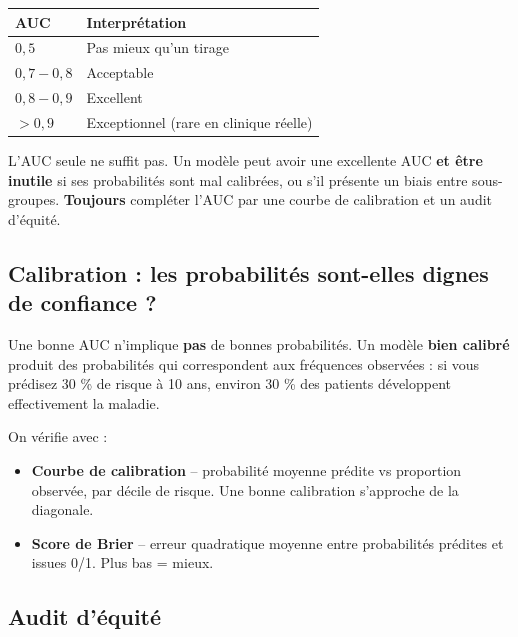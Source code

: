 \documentclass[11pt,a4paper]{article}
\begin{document}
\begin{table}[h]
\centering
\begin{tabular}{ll}
\toprule
AUC & Interpr\'etation \\
\midrule
$0{,}5$              & Pas mieux qu'un tirage \\
$0{,}7 - 0{,}8$      & Acceptable \\
$0{,}8 - 0{,}9$      & Excellent \\
$> 0{,}9$            & Exceptionnel (rare en clinique r\'eelle) \\
\bottomrule
\end{tabular}
\end{table}

\begin{attention}
L'AUC seule ne suffit pas. Un mod\`ele peut avoir une excellente AUC
\textbf{et \^etre inutile} si ses probabilit\'es sont mal calibr\'ees,
ou s'il pr\'esente un biais entre sous-groupes. \textbf{Toujours}
compl\'eter l'AUC par une courbe de calibration et un audit d'\'equit\'e.
\end{attention}

\subsection{Calibration : les probabilit\'es sont-elles dignes de confiance ?}

Une bonne AUC n'implique \textbf{pas} de bonnes probabilit\'es. Un
mod\`ele \textbf{bien calibr\'e} produit des probabilit\'es qui
correspondent aux fr\'equences observ\'ees : si vous pr\'edisez 30 \% de
risque \`a 10 ans, environ 30 \% des patients d\'eveloppent
effectivement la maladie.

On v\'erifie avec :

\begin{itemize}
  \item \textbf{Courbe de calibration} -- probabilit\'e moyenne pr\'edite
        vs proportion observ\'ee, par d\'ecile de risque. Une bonne
        calibration s'approche de la diagonale.
  \item \textbf{Score de Brier} -- erreur quadratique moyenne entre
        probabilit\'es pr\'edites et issues 0/1. Plus bas = mieux.
\end{itemize}

\subsection{Audit d'\'equit\'e}
\end{document}
